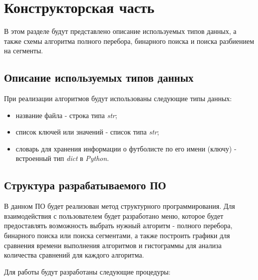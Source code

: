 \chapter{Конструкторская часть}
В этом разделе будут представлено описание используемых типов данных, а также схемы алгоритма полного перебора, бинарного поиска и поиска разбиением на сегменты.

\section{Описание используемых типов данных}

При реализации алгоритмов будут использованы следующие типы данных:

\begin{itemize}
	\item название файла - строка типа \textit{str};
	\item список ключей или значений - список типа \textit{str};
	\item словарь для хранения информации о футболисте по его имени (ключу) - встроенный тип \textit{dict} в \textit{Python}.
\end{itemize}


\section{Структура разрабатываемого ПО}

В данном ПО будет реализован метод структурного программирования. Для взаимодействия с пользователем будет разработано меню, которое будет предоставлять возможность выбрать нужный алгоритм - полного перебора, бинарного поиска или поиска сегментами, а также построить графики для сравнения времени выполнения алгоритмов и гистограммы для анализа количества сравнений для каждого алгоритма. 

Для работы будут разработаны следующие процедуры:

